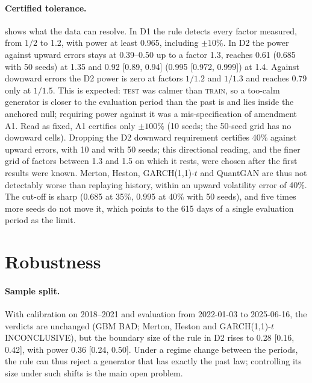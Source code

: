 \documentclass[11pt,a4paper]{article}
\theoremstyle{plain}
\newcommand{\TRAIN}{\textsc{train}}
\newcommand{\TEST}{\textsc{test}}
\newcommand{\BAD}{\textsf{BAD}}
\newcommand{\INCONCL}{\textsf{INCONCLUSIVE}}
\newcommand{\GARCHt}{GARCH(1,1)-$t$}
\begin{document}
\paragraph{Certified tolerance.}  shows what the data can resolve. In D1 the rule
detects every factor measured, from $1/2$ to 1.2, with power at least 0.965, including $\pm10\%$. In
D2 the power against upward errors stays at 0.39--0.50 up to a factor 1.3, reaches 0.61 (0.685 with
50 seeds) at 1.35 and 0.92 [0.89, 0.94] (0.995 [0.972, 0.999]) at 1.4. Against downward errors the
D2 power is zero at factors $1/1.2$ and $1/1.3$ and reaches 0.79 only at $1/1.5$. This is expected:
\TEST{} was calmer than \TRAIN, so a too-calm generator is closer to the evaluation period than the
past is and lies inside the anchored null; requiring power against it was a mis-specification of
amendment A1. Read as fixed, A1 certifies only $\pm100\%$ (10 seeds; the 50-seed grid has no
downward cells). Dropping the D2 downward requirement certifies 40\% against upward errors, with 10
and with 50 seeds; this directional reading, and the finer grid of factors between 1.3 and 1.5 on
which it rests, were chosen after the first results were known. Merton, Heston, \GARCHt{} and
QuantGAN are thus not detectably worse than replaying history, within an upward volatility error of
40\%. The cut-off is sharp (0.685 at 35\%, 0.995 at 40\% with 50 seeds), and five times more seeds
do not move it, which points to the 615 days of a single evaluation period as the limit.

\section{Robustness}\label{sec:robust}

\paragraph{Sample split.} With calibration on 2018--2021 and evaluation from 2022-01-03 to
2025-06-16, the verdicts are unchanged (GBM \BAD; Merton, Heston and \GARCHt{} \INCONCL{}), but the
boundary size of the rule in D2 rises to 0.28 [0.16, 0.42], with power 0.36 [0.24, 0.50]. Under a
regime change between the periods, the rule can thus reject a generator that has exactly the past
law; controlling its size under such shifts is the main open problem.
\end{document}
